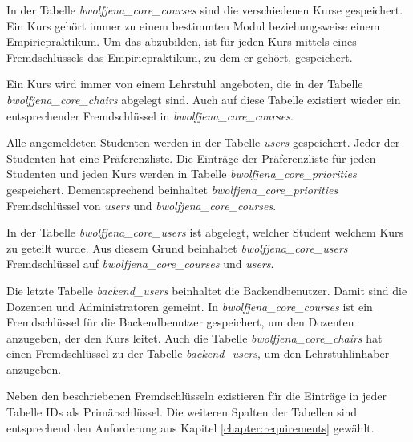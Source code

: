        In der Tabelle \textit{bwolfjena\_core\_courses} sind die verschiedenen Kurse gespeichert.
        Ein Kurs gehört immer zu einem bestimmten Modul beziehungsweise einem Empiriepraktikum.
        Um das abzubilden, ist für jeden Kurs mittels eines Fremdschlüssels das Empiriepraktikum, zu dem er gehört, gespeichert.
        
        Ein Kurs wird immer von einem Lehrstuhl angeboten, die in der Tabelle \textit{bwolfjena\_core\_chairs} abgelegt sind.
        Auch auf diese Tabelle existiert wieder ein entsprechender Fremdschlüssel in \textit{bwolfjena\_core\_courses}. 
        
        Alle angemeldeten Studenten werden in der Tabelle \textit{users} gespeichert.
        Jeder der Studenten hat eine Präferenzliste.
        Die Einträge der Präferenzliste für jeden Studenten und jeden Kurs werden in Tabelle \textit{bwolfjena\_core\_priorities} gespeichert.
        Dementsprechend beinhaltet \textit{bwolfjena\_core\_priorities} Fremdschlüssel von \textit{users} und \textit{bwolfjena\_core\_courses}.
        
        In der Tabelle \textit{bwolfjena\_core\_users} ist abgelegt, welcher Student welchem Kurs zu geteilt wurde.
        Aus diesem Grund beinhaltet \textit{bwolfjena\_core\_users} Fremdschlüssel auf \textit{bwolfjena\_core\_courses} und \textit{users}. 
        
        Die letzte Tabelle \textit{backend\_users} beinhaltet die Backendbenutzer.
        Damit sind die Dozenten und Administratoren gemeint.
        In \textit{bwolfjena\_core\_courses} ist ein Fremdschlüssel für die Backendbenutzer gespeichert, um den Dozenten anzugeben, der den Kurs leitet.
        Auch die Tabelle \textit{bwolfjena\_core\_chairs} hat einen Fremdschlüssel zu der Tabelle \textit{backend\_users}, um den Lehrstuhlinhaber anzugeben.
        
        Neben den beschriebenen Fremdschlüsseln existieren für die Einträge in jeder Tabelle IDs als Primärschlüssel.
        Die weiteren Spalten der Tabellen sind entsprechend den Anforderung aus Kapitel \ref{chapter:requirements} gewählt.
        
        
        
    
